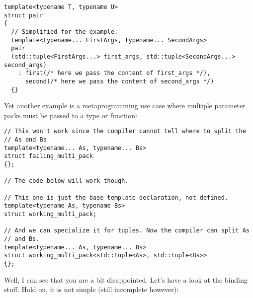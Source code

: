 \begin{lstlisting}
template<typename T, typename U>
struct pair
{
  // Simplified for the example.
  template<typename... FirstArgs, typename... SecondArgs>
  pair
  (std::tuple<FirstArgs...> first_args, std::tuple<SecondArgs...> second_args)
    : first(/* here we pass the content of first_args */),
      second(/* here we pass the content of second_args */)
  {}
\end{lstlisting}

Yet another example is a metaprogramming use case where multiple
parameter packs must be passed to a type or function:

\begin{lstlisting}
// This won't work since the compiler cannot tell where to split the
// As and Bs
template<typename... As, typename... Bs>
struct failing_multi_pack
{};

// The code below will work though.

// This one is just the base template declaration, not defined.
template<typename As, typename Bs>
struct working_multi_pack;

// And we can specialize it for tuples. Now the compiler can split As
// and Bs.
template<typename... As, typename... Bs>
struct working_multi_pack<std::tuple<As>, std::tuple<Bs>>
{};
\end{lstlisting}

Well, I can see that you are a bit disappointed. Let's have a look at
the binding stuff. Hold on, it is not simple (still incomplete however):

\label{example:argument-binding}

